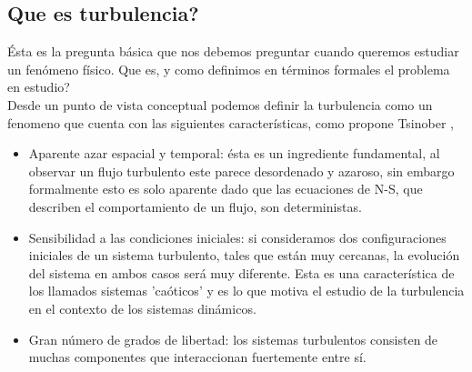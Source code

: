 \documentclass[executivepaper,12pt]{article}
\numberwithin{equation}{section}
\begin{document}
\subsection{Que es turbulencia?}
Ésta es la pregunta básica que nos debemos preguntar cuando queremos estudiar un fenómeno físico. Que es, y como definimos en términos formales el problema en estudio? \\
Desde un punto de vista conceptual podemos definir la turbulencia como un fenomeno que cuenta con las siguientes características, como propone Tsinober \parencite{tsinober2019},
\begin{itemize}
	\item Aparente azar espacial y temporal: ésta es un ingrediente fundamental, al observar un flujo turbulento este parece desordenado y azaroso, sin embargo formalmente esto es solo aparente dado que las ecuaciones de N-S, que describen el comportamiento de un flujo, son deterministas.
	\item Sensibilidad a las condiciones iniciales: si consideramos dos configuraciones iniciales de un sistema turbulento, tales que están muy cercanas, la evolución del sistema en ambos casos será muy diferente. Esta es una característica de los llamados sistemas 'caóticos' y es lo que motiva el estudio de la turbulencia en el contexto de los sistemas dinámicos.
	\item Gran número de grados de libertad: los sistemas turbulentos consisten de muchas componentes que interaccionan fuertemente entre sí. 
\end{itemize}
\end{document}

